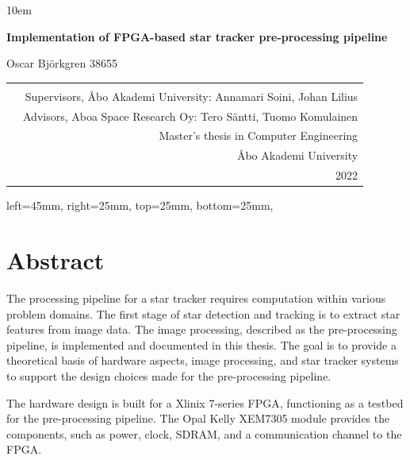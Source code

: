 \documentclass[12pt]{report}
\begin{document}
\emergencystretch 10em
\begin{titlepage}
\begin{center}
        \vspace*{5cm}
        
        \LARGE
        \textbf{Implementation of FPGA-based star tracker pre-processing pipeline}
        \\
        \vspace{0.5cm}
        
        Oscar Björkgren 38655
        
\end{center}
\vspace{8cm}
\begin{tabular}{l r }
\multirow{4}{10em}{
} \\
\multirow{12}{1em}{
} &

Supervisors, Åbo Akademi University: Annamari Soini, Johan Lilius\\ &
Advisors, Aboa Space Research Oy: Tero Säntti, Tuomo Komulainen\\ & 
Master's thesis in Computer Engineering\\ &
Åbo Akademi University\\ &
2022

\end{tabular}

\flushright
\end{titlepage}
\newgeometry
{
 left=45mm,
 right=25mm,
 top=25mm,
 bottom=25mm,
}
\section*{Abstract}
The processing pipeline for a star tracker requires computation within various problem domains. The first stage of star detection and tracking is to extract star features from image data.
The image processing, described as the pre-processing pipeline, is implemented and documented in this thesis. The goal is to provide a theoretical basis of hardware aspects, image processing, and star tracker systems to support the design choices made for the pre-processing pipeline.

The hardware design is built for a Xlinix 7-series FPGA, functioning as a testbed for the pre-processing pipeline.
The Opal Kelly XEM7305 module provides the components, such as power, clock, SDRAM, and a communication channel to the FPGA.
\end{document}
